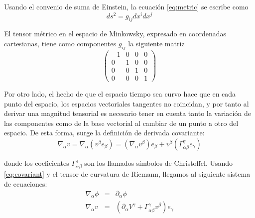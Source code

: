 \documentclass[a4paper,11pt]{article}
\begin{document}
\noindent
Usando el convenio de suma de Einstein, la ecuación \eqref{eq:metric} se escribe como
$$
ds^2 = g_{ij} dx^i dx^j
$$

\noindent
El tensor métrico en el espacio de Minkowsky, expresado en coordenadas 
cartesianas, tiene como componentes $g_{ij}$ la siguiente matriz
$$
\begin{pmatrix}
-1 & 0 & 0 & 0 \\
0 & 1 & 0 & 0 \\
0 & 0 & 1 & 0 \\
0 & 0 & 0 & 1
\end{pmatrix}
$$

\noindent
Por otro lado, el hecho de que el espacio tiempo sea curvo hace que en cada
punto del espacio, los espacios vectoriales tangentes no coincidan, y por tanto al
derivar una magnitud tensorial es necesario tener en cuenta tanto la variación
de las componentes como de la base vectorial al cambiar de un punto a otro del
espacio. De esta forma, surge la definición de derivada covariante:
\begin{equation}
\label{eq:covariant}
\nabla_{\alpha} v = \nabla_{\alpha} (v^{\beta} e_{\beta}) = (\nabla_{\alpha}v^{\beta})e_{\beta} + v^{\beta}(\Gamma^{\gamma}_{\alpha \beta}e_{\gamma})
\end{equation}

\noindent
donde los coeficientes $\Gamma^{\gamma}_{\alpha \beta}$ son los llamados 
símbolos de Christoffel. Usando \eqref{eq:covariant} y el tensor de curvatura 
de Riemann, llegamos al siguiente sistema de ecuaciones:
\begin{eqnarray}
\nabla_{\alpha} \phi &=& \partial_{\alpha} \phi \label{eq:eq_01} \\
\nabla_{\alpha} v    &=& (\partial_{\alpha} V^{\gamma} + \Gamma_{\alpha \beta}^\gamma v^{\beta})e_{\gamma}  \label{eq:eq_02}
\end{eqnarray}
\end{document}
